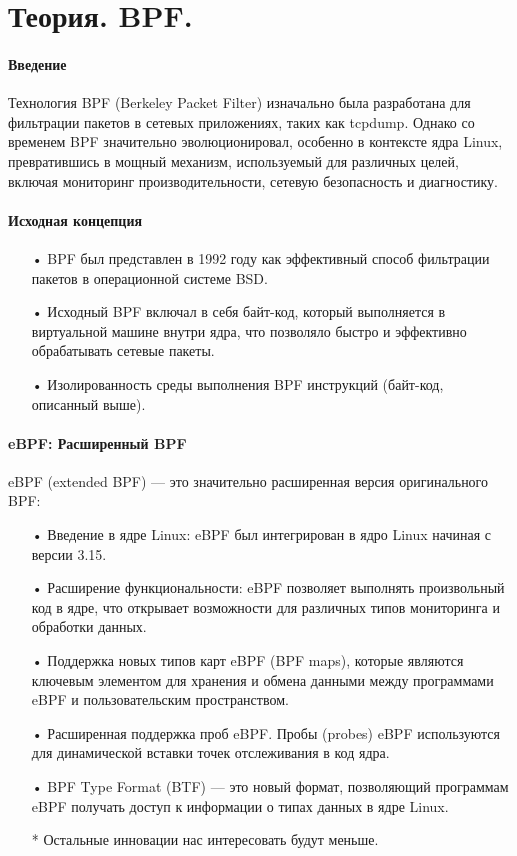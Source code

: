 \section{Теория. BPF.}
\label{theory-bpf-0}

\begin{flushleft}
	
\paragraph{Введение}

	Технология BPF (Berkeley Packet Filter) изначально была разработана для фильтрации пакетов в сетевых приложениях, таких как tcpdump. Однако со временем BPF значительно эволюционировал, особенно в контексте ядра Linux, превратившись в мощный механизм, используемый для различных целей, включая мониторинг производительности, сетевую безопасность и диагностику.
	
\paragraph{Исходная концепция}

\begin{itemize}
	\item[•] BPF был представлен в 1992 году как эффективный способ фильтрации пакетов в операционной системе BSD.
	\item[•] Исходный BPF включал в себя байт-код, который выполняется в виртуальной машине внутри ядра, что позволяло быстро и эффективно обрабатывать сетевые пакеты.
	\item[•] Изолированность среды выполнения BPF инструкций (байт-код, описанный выше).
\end{itemize}

\paragraph{eBPF: Расширенный BPF}

eBPF (extended BPF) — это значительно расширенная версия оригинального BPF:
\begin{itemize}
	\item[•] Введение в ядре Linux: eBPF был интегрирован в ядро Linux начиная с версии 3.15.
	\item[•] Расширение функциональности: eBPF позволяет выполнять произвольный код в ядре, что открывает возможности для различных типов мониторинга и обработки данных.
	\item[•] Поддержка новых типов карт eBPF (BPF maps), которые являются ключевым элементом для хранения и обмена данными между программами eBPF и пользовательским пространством.
	\item[•] Расширенная поддержка проб eBPF. Пробы (probes) eBPF используются для динамической вставки точек отслеживания в код ядра.
	\item[•] BPF Type Format (BTF) — это новый формат, позволяющий программам eBPF получать доступ к информации о типах данных в ядре Linux.
	\item[*] Остальные инновации нас интересовать будут меньше.
\end{itemize}



\end{flushleft}
